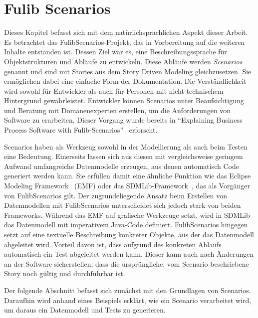 \chapter{Fulib Scenarios}\label{ch:fulib-scenarios}

Dieses Kapitel befasst sich mit dem natürlichsprachlichen Aspekt dieser Arbeit.
Es betrachtet das FulibScenarios-Projekt, das in Vorbereitung auf die weiteren Inhalte entstanden ist.
Dessen Ziel war es, eine Beschreibungssprache für Objektstrukturen und Abläufe zu entwickeln.
Diese Abläufe werden \emph{Scenarios} genannt und sind mit Stories aus dem Story Driven Modeling gleichzusetzen.
Sie ermöglichen dabei eine einfache Form der Dokumentation.
Die Verständlichkeit wird sowohl für Entwickler als auch für Personen mit nicht-technischem Hintergrund gewährleistet.
Entwickler können Scenarios unter Beaufsichtigung und Beratung mit Domänenexperten erstellen, um die Anforderungen von Software zu erarbeiten.
Dieser Vorgang wurde bereits in ``Explaining Business Process Software with Fulib-Scenarios''~\cite{explain} erforscht.

Scenarios haben als Werkzeug sowohl in der Modellierung als auch beim Testen eine Bedeutung.
Einerseits lassen sich aus diesen mit vergleichsweise geringem Aufwand umfangreiche Datenmodelle erzeugen, aus denen automatisch Code generiert werden kann.
Sie erfüllen damit eine ähnliche Funktion wie das Eclipse Modeling Framework~\cite{emf} (EMF) oder das SDMLib-Framework~\cite{networkparser}, das als Vorgänger von FulibScenarios gilt.
Der zugrundeliegende Ansatz beim Erstellen von Datenmodellen mit FulibScenarios unterscheidet sich jedoch stark von beiden Frameworks.
Während das EMF auf grafische Werkzeuge setzt, wird in SDMLib das Datenmodell mit imperativem Java-Code definiert.
FulibScenarios hingegen setzt auf eine textuelle Beschreibung konkreter Objekte, aus der das Datenmodell abgeleitet wird.
Vorteil davon ist, dass aufgrund des konkreten Ablaufs automatisch ein Test abgeleitet werden kann.
Dieser kann auch nach Änderungen an der Software sicherstellen, dass die ursprüngliche, vom Scenario beschriebene Story noch gültig und durchführbar ist.

Der folgende Abschnitt befasst sich zunächst mit den Grundlagen von Scenarios.
Daraufhin wird anhand eines Beispiels erklärt, wie ein Scenario verarbeitet wird, um daraus ein Datenmodell und Tests zu generieren.



